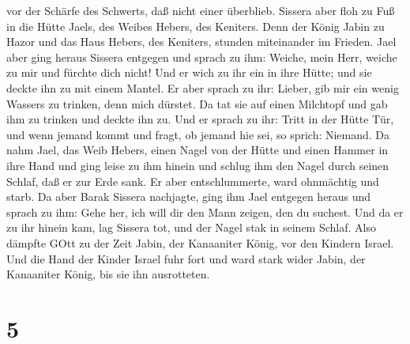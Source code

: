 vor der Schärfe des Schwerts, daß nicht einer überblieb. 
Sissera aber floh zu Fuß in die Hütte Jaels, des Weibes Hebers, des
Keniters. Denn der König Jabin zu Hazor und das Haus Hebers, des
Keniters, stunden miteinander im Frieden.  Jael aber ging
heraus Sissera entgegen und sprach zu ihm: Weiche, mein Herr, weiche zu
mir und fürchte dich nicht! Und er wich zu ihr ein in ihre Hütte; und
sie deckte ihn zu mit einem Mantel.  Er aber sprach zu ihr:
Lieber, gib mir ein wenig Wassers zu trinken, denn mich dürstet. Da tat
sie auf einen Milchtopf und gab ihm zu trinken und deckte ihn zu.
 Und er sprach zu ihr: Tritt in der Hütte Tür, und wenn
jemand kommt und fragt, ob jemand hie sei, so sprich: Niemand.
 Da nahm Jael, das Weib Hebers, einen Nagel von der Hütte
und einen Hammer in ihre Hand und ging leise zu ihm hinein und schlug
ihm den Nagel durch seinen Schlaf, daß er zur Erde sank. Er aber
entschlummerte, ward ohnmächtig und starb.  Da aber Barak
Sissera nachjagte, ging ihm Jael entgegen heraus und sprach zu ihm: Gehe
her, ich will dir den Mann zeigen, den du suchest. Und da er zu ihr
hinein kam, lag Sissera tot, und der Nagel stak in seinem Schlaf.
 Also dämpfte GOtt zu der Zeit Jabin, der Kanaaniter König,
vor den Kindern Israel.  Und die Hand der Kinder Israel
fuhr fort und ward stark wider Jabin, der Kanaaniter König, bis sie ihn
ausrotteten.

\hypertarget{section-4}{%
\section{5}\label{section-4}}


